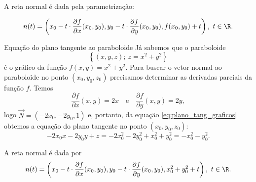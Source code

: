 A reta normal é dada pela parametrização: 
\begin{comment}
$$
\begin{cases}
    x(t)=x_0 - t \cdot \dfrac{\partial f}{\partial x}(x_0,y_0)\\[.5em]
    y(t)=y_0 - t\cdot \dfrac{\partial f}{\partial y}(x_0,y_0)\\[.5em]
    z(t)=f(x_0,y_0) + t. 
\end{cases}
$$
\end{comment}
$$n(t)=\left(x_0 - t \cdot \dfrac{\partial f}{\partial x}(x_0,y_0),y_0 - t\cdot \dfrac{\partial f}{\partial y}(x_0,y_0), f(x_0,y_0) + t\right),~t\in\R. 
$$
\begin{example}{Equação do plano tangente ao paraboloide}{}
Já sabemos que o paraboloide
$$\left\{(x,y,z);~z=x^2+y^2\right\}$$
é o gráfico da função $f(x,y)=x^2+y^2$. Para buscar o vetor normal ao paraboloide no ponto $(x_0,y_0,z_0)$ precisamos determinar as derivadas parciais da função $f$. Temos
$$\dfrac{\partial f}{\partial x}(x,y)=2x \quad \mbox{e} \quad \dfrac{\partial f}{\partial y}(x,y)=2y ,$$
logo $\Vec{N}= (-2x_0,-2y_0,1)$
e, portanto, da equação \eqref{eq:plano_tang_graficos} obtemos a equação do plano tangente no ponto $(x_0,y_0,z_0)$:
$$ -2x_0x-2y_0y+z=-2x_0^2-2y_0^2+x_0^2 +y_0^2=-x_0^2-y_0^2.$$

A reta normal é dada por
$$n(t)=\left(x_0-t \cdot \dfrac{\partial f}{\partial x}(x_0,y_0),y_0- t\cdot\dfrac{\partial f}{\partial y}(x_0,y_0), x_0^2+y_0^2+t\right),~t\in\R. $$

\begin{center}
    \begin{comment}\begin{tikzpicture}[tdplot_main_coords,scale=3.0]
		\pgfmathsetmacro{\tini}{0.5*pi}
		\pgfmathsetmacro{\tfin}{1.85*pi}
		\pgfmathsetmacro{\tend}{2.5*pi}
		\draw[-latex] (0,0,0) -- (1.5,0,0) node [below left] {$x$};
		\draw[dashed] (0,0,0) -- (-1.25,0,0);
		\draw[-latex] (0,0,0) -- (0,1.5,0) node [right] {$y$};
		\draw[dashed] (0,0,0) -- (0,-1.25,0);
\draw[thick, green!150,-latex,shift={(1/2,-1/2,1/2)}] (0,0,0)--({-1/3},{-(-1/3)},1/3) node[above,rotate=45]{\footnotesize$(-2x_0,-2y_0,1)$};
  

\end{comment}
\end{center}
\end{example}
